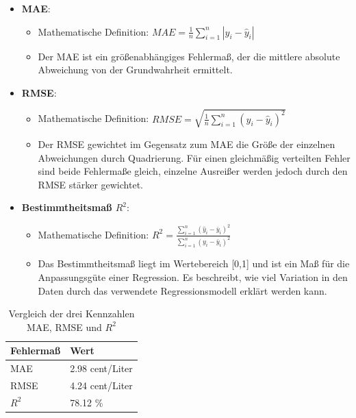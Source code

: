 \documentclass[
ngerman          %
,a4paper          %
,11pt
,pdftex
]{report}
\begin{document}
\newpage
\begin{itemize}
	\item \textbf{\acf{MAE}}: 
	\begin{itemize}
		\item Mathematische Definition: $MAE = \frac{1}{n} \sum_{i=1}^{n}|y_i - \hat{y}_i|$
		\item Der \ac{MAE} ist ein größenabhängiges Fehlermaß, der die mittlere absolute Abweichung von der Grundwahrheit ermittelt. 
	\end{itemize}
	\item \textbf{\acf{RMSE}}:
	\begin{itemize}
		\item Mathematische Definition: $RMSE = \sqrt{\frac{1}{n} \sum_{i=1}^{n}(y_i - \hat{y}_i)^2} $
		\item Der \ac{RMSE} gewichtet im Gegensatz zum \ac{MAE} die Größe der einzelnen Abweichungen durch Quadrierung. Für einen gleichmäßig verteilten Fehler sind beide Fehlermaße gleich, einzelne Ausreißer werden jedoch durch den \ac{RMSE} stärker gewichtet.
	\end{itemize}
	\item \textbf{Bestimmtheitsmaß $R^2$}:
	\begin{itemize}
		\item Mathematische Definition: $ R^2 = \frac{\sum_{i=1}^{n} (\hat{y}_i - \bar{y}_i)^2}{\sum_{i=1}^{n} (y_i - \bar{y}_i)^2}$
		\item Das Bestimmtheitsmaß liegt im Wertebereich [0,1] und ist ein Maß für die Anpassungsgüte einer Regression. Es beschreibt, wie viel Variation in den Daten durch das verwendete Regressionsmodell erklärt werden kann. 
	\end{itemize}
\end{itemize}

\begin{table}
	\centering
	\begin{tabular}{l l}
		\textbf{Fehlermaß} & \textbf{Wert} \\ 
		\hline 
		\hline
		\ac{MAE} & 2.98 cent/Liter \\ 
		\ac{RMSE} & 4.24 cent/Liter \\ 
		$R^2$ & 78.12 \% \\ 
		\hline
	\end{tabular} 
	\caption{Vergleich der drei Kennzahlen MAE, RMSE und $R^2$}
	\label{tab:eval}
\end{table}
\end{document}
